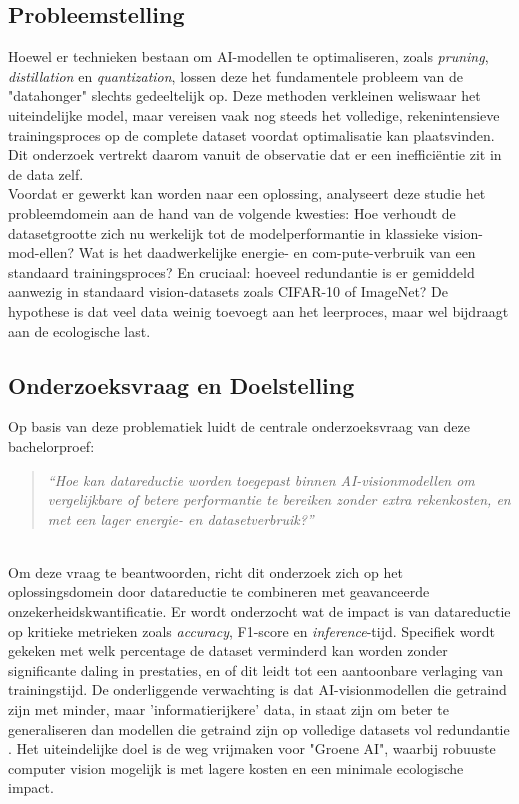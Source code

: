 \subsection{Probleemstelling}
Hoewel er technieken bestaan om AI-modellen te optimaliseren, zoals \textit{pruning}, \textit{distillation} en \newline \textit{quantization}, lossen deze het fundamentele probleem van de "datahonger" slechts gedeeltelijk op. Deze methoden verkleinen weliswaar het uiteindelijke model, maar vereisen vaak nog steeds het volledige, rekenintensieve trainingsproces op de complete dataset voordat optimalisatie kan plaatsvinden. Dit onderzoek vertrekt daarom vanuit de observatie dat er een inefficiëntie zit in de data zelf.\\

Voordat er gewerkt kan worden naar een oplossing, analyseert deze studie het probleemdomein aan de hand van de volgende kwesties: Hoe verhoudt de datasetgrootte zich nu werkelijk tot de modelperformantie in klassieke vision-mod-\newline ellen? Wat is het daadwerkelijke energie- en com\newline-pute-verbruik van een standaard trainingsproces? En cruciaal: hoeveel redundantie is er gemiddeld aanwezig in standaard vision-datasets zoals CIFAR-10 of ImageNet? De hypothese is dat veel data weinig toevoegt aan het leerproces, maar wel bijdraagt aan de ecologische last.\\

\subsection{Onderzoeksvraag en Doelstelling}
Op basis van deze problematiek luidt de centrale onderzoeksvraag van deze bachelorproef:

\begin{quote}
\textit{“Hoe kan datareductie worden toegepast binnen AI-visionmodellen om vergelijkbare of betere performantie te bereiken zonder extra rekenkosten, en met een lager energie- en datasetverbruik?”}
\end{quote}\\

Om deze vraag te beantwoorden, richt dit onderzoek zich op het oplossingsdomein door datareductie te combineren met geavanceerde onzekerheidskwantificatie. Er wordt onderzocht wat de impact is van datareductie op kritieke metrieken zoals \textit{accuracy}, F1-score en \textit{inference}-tijd. Specifiek wordt gekeken met welk percentage de dataset verminderd kan worden zonder significante daling in prestaties, en of dit leidt tot een aantoonbare verlaging van trainingstijd. De onderliggende verwachting is dat AI-visionmodellen die getraind zijn met minder, maar 'informatierijkere' data, in staat zijn om beter te generaliseren dan modellen die getraind zijn op volledige datasets vol redundantie \autocite{chen2020simple}. Het uiteindelijke doel is de weg vrijmaken voor "Groene AI", waarbij robuuste computer vision mogelijk is met lagere kosten en een minimale ecologische impact.

